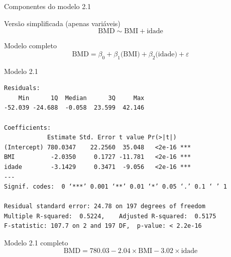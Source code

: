 \documentclass{beamer}
\begin{document}
\begin{frame}{\scriptsize Componentes do modelo 2.1}
  \begin{block}{\footnotesize Versão simplificada (apenas variáveis)}
    \footnotesize
    \begin{displaymath}
      \text{BMD} \sim \text{BMI} + \text{idade}
    \end{displaymath}
  \end{block}
  \bigskip
  \bigskip
  \begin{block}{Modelo completo}
    \footnotesize
    \begin{displaymath}
      \text{BMD} =\beta_0 + \beta_1 \text{(BMI)} + \beta_2 \text{(idade)} +\varepsilon
    \end{displaymath}
  \end{block}
  \vfill
\end{frame}

\begin{frame}[fragile]{\scriptsize }
  \begin{center}
    \begin{exampleblock}{Modelo 2.1}
      \tiny
\begin{verbatim}
Residuals:
    Min      1Q  Median      3Q     Max 
-52.039 -24.688  -0.058  23.599  42.146 

Coefficients:
            Estimate Std. Error t value Pr(>|t|)    
(Intercept) 780.0347    22.2560  35.048   <2e-16 ***
BMI          -2.0350     0.1727 -11.781   <2e-16 ***
idade        -3.1429     0.3471  -9.056   <2e-16 ***
---
Signif. codes:  0 ‘***’ 0.001 ‘**’ 0.01 ‘*’ 0.05 ‘.’ 0.1 ‘ ’ 1

Residual standard error: 24.78 on 197 degrees of freedom
Multiple R-squared:  0.5224,	Adjusted R-squared:  0.5175 
F-statistic: 107.7 on 2 and 197 DF,  p-value: < 2.2e-16
\end{verbatim}
    \end{exampleblock}
  \begin{exampleblock}{Modelo 2.1 completo}
    \footnotesize
    \begin{displaymath}
      \text{BMD} =780.03 -2.04 \times\text{BMI} -3.02 \times\text{idade}
    \end{displaymath}
  \end{exampleblock}
  \end{center}
\end{frame}
\end{document}
